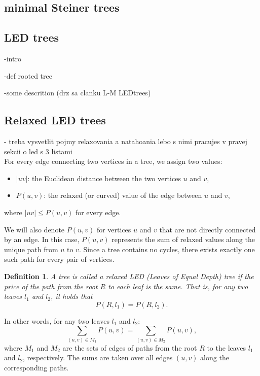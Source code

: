 \documentclass[12pt]{article}
\newcommand{\Price}[2]{P(#1,#2)}
\newtheorem{definition}{Definition}
\begin{document}
	\subsection{minimal Steiner trees}
	
	
	\subsection{LED trees}
		-intro
	
		-def rooted tree
		
		-some descrition (drz sa clanku L-M LEDtrees)
		
	\subsection{Relaxed LED trees}	
	
		- treba vysvetlit pojmy relaxovania a natahoania lebo s nimi pracujes v pravej sekcii o led s 3 listami
			\\
		
				
		For every edge connecting two vertices in a tree, we assign two values:
		\begin{itemize}
			\item \( |uv| \): the Euclidean distance between the two vertices \( u \) and \( v \),
			\item \( \Price{u}{v} \): the relaxed (or curved) value of the edge between \( u \) and \( v \),
		\end{itemize}
		where \( |uv| \leq \Price{u}{v} \) for every edge.
		
		We will also denote \( \Price{u}{v} \) for vertices \( u \) and \( v \) that are not directly connected by an edge. In this case, \( \Price{u}{v} \) represents the sum of relaxed values along the unique path from \( u \) to \( v \). Since a tree contains no cycles, there exists exactly one such path for every pair of vertices.
		
		\begin{definition}\label{def:led}
			A tree is called a relaxed LED (Leaves of Equal Depth) tree if the price of the path from the root \( R \) to each leaf is the same. That is, for any two leaves \( l_1 \) and \( l_2 \), it holds that
			\[
			\Price{R}{l_1} = \Price{R}{l_2}.
			\]
		\end{definition}
	
		In other words, for any two leaves \( l_1 \) and \( l_2 \):
		\[
		 \sum_{(u,v) \in M_1} \Price{u}{v} = \sum_{(u,v) \in M_2} \Price{u}{v},
		\]
		where \( M_1 \) and \( M_2 \) are the sets of edges of paths from the root \( R \) to the leaves \( l_1 \) and \( l_2 \), respectively. The sums are taken over all edges \( (u,v) \) along the corresponding paths.
		
\end{document}
